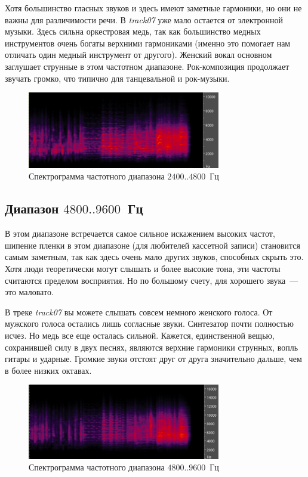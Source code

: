 \documentclass[oneside, final, 14pt]{extreport}
\begin{document}
Хотя большинство гласных звуков и здесь имеют заметные гармоники, но они не важны для различимости речи. В \emph{track07} уже мало остается от электронной музыки. Здесь сильна оркестровая медь, так как большинство медных инструментов очень богаты верхними гармониками (именно это помогает нам отличать один медный инструмент от другого). Женский вокал основном заглушает струнные в этом частотном диапазоне. Рок-композиция продолжает звучать громко, что типично для танцевальной и рок-музыки.

\begin{figure}[h]
  \centering
  \includegraphics[width=0.75\textwidth]{pic-specter-06}
  \caption{Спектрограмма частотного диапазона $2400..4800$~Гц}
  \label{pic-specter-06}
\end{figure}

\subsection{Диапазон $4800..9600$~Гц}
В этом диапазоне встречается самое сильное искажением высоких частот, шипение пленки в этом диапазоне (для любителей кассетной записи) становится самым заметным, так как здесь очень мало других звуков, способных скрыть это. Хотя люди теоретически могут слышать и более высокие тона, эти частоты считаются пределом восприятия. Но по большому счету, для хорошего звука~--- это маловато.

В треке \emph{track07} вы можете слышать совсем немного женского голоса. От мужского голоса остались лишь согласные звуки. Синтезатор почти полностью исчез. Но медь все еще осталась сильной. Кажется, единственной вещью, сохранившей силу в двух песнях, являются верхние гармоники струнных, вопль гитары и ударные. Громкие звуки отстоят друг от друга значительно дальше, чем в более низких октавах.

\begin{figure}[h]
  \centering
  \includegraphics[width=0.75\textwidth]{pic-specter-07}
  \caption{Спектрограмма частотного диапазона $4800..9600$~Гц}
  \label{pic-specter-07}
\end{figure}
\end{document}
